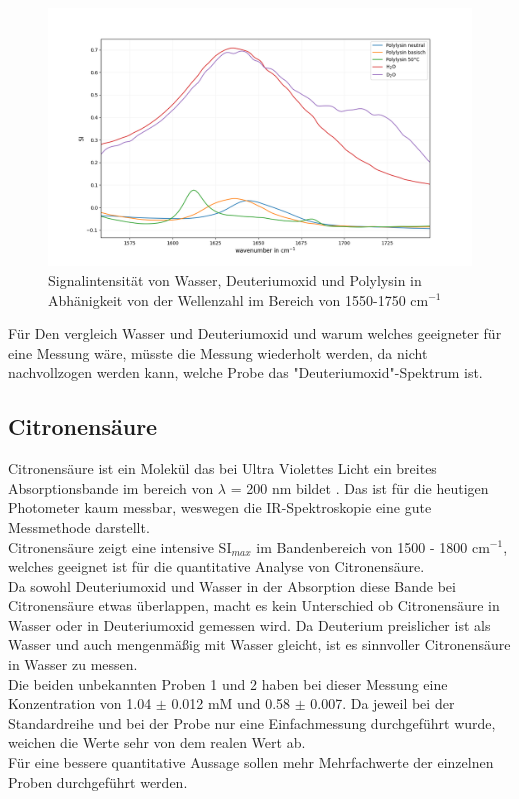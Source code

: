 \documentclass[10pt,a4paper]{article}
\begin{document}
			\begin{figure}[H]
				\centering
				\includegraphics[scale=0.55]{water_polylysin.png}
				\caption{Signalintensität von Wasser, Deuteriumoxid und Polylysin in Abhänigkeit von der Wellenzahl im Bereich von 1550-1750 cm$^{-1}$}
				\label{fig:water_polylysin_full}
			\end{figure}
			
			Für Den vergleich Wasser und Deuteriumoxid und warum welches geeigneter für eine Messung wäre, müsste die Messung wiederholt werden, da nicht nachvollzogen werden kann, welche Probe das "Deuteriumoxid"-Spektrum ist.
			
			\subsection{Citronensäure}
			Citronensäure ist ein Molekül das bei Ultra Violettes Licht ein breites Absorptionsbande im bereich von $\lambda$ = 200 nm bildet \cite{Citricacid_UV}. Das ist für die heutigen Photometer kaum messbar, weswegen die IR-Spektroskopie eine gute Messmethode darstellt.\\
			Citronensäure zeigt eine intensive SI$_{max}$ im Bandenbereich von 1500 - 1800 cm$^{-1}$, welches geeignet ist für die quantitative Analyse von Citronensäure.\\
			Da sowohl Deuteriumoxid und Wasser in der Absorption diese Bande bei Citronensäure etwas überlappen, macht es kein Unterschied ob Citronensäure in Wasser oder in Deuteriumoxid gemessen wird. Da Deuterium preislicher ist als Wasser und auch mengenmäßig mit Wasser gleicht, ist es sinnvoller Citronensäure in Wasser zu messen.\\
			Die beiden unbekannten Proben 1 und 2 haben bei dieser Messung eine Konzentration von 1.04 $\pm$ 0.012 mM und 0.58 $\pm$ 0.007.
			Da jeweil bei der Standardreihe und bei der Probe nur eine Einfachmessung durchgeführt wurde, weichen die Werte sehr von dem realen Wert ab.\\
			Für eine bessere quantitative Aussage sollen mehr Mehrfachwerte der einzelnen Proben durchgeführt werden.
			
\end{document}
